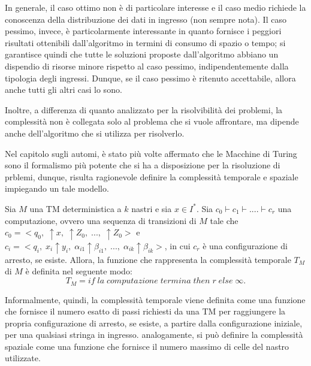   In generale, il caso ottimo non è di particolare interesse e il caso medio richiede la conoscenza della distribuzione dei dati in ingresso (non sempre nota). Il caso pessimo, invece, è particolarmente interessante in quanto fornisce i peggiori risultati ottenibili dall'algoritmo in termini di consumo di spazio o tempo; si garantisce quindi che tutte le soluzioni proposte dall'algoritmo abbiano un dispendio di risorse minore rispetto al caso pessimo, indipendentemente dalla tipologia degli ingressi. Dunque, se il caso pessimo è ritenuto accettabile, allora anche tutti gli altri casi lo sono. 

  Inoltre, a differenza di quanto analizzato per la risolvibilità dei problemi, la complessità non è collegata solo al problema che si vuole affrontare, ma dipende anche dell'algoritmo che si utilizza per risolverlo. 

  \vspace*{10px}

  Nel capitolo sugli automi, è stato più volte affermato che le Macchine di Turing sono il formalismo più potente che si ha a disposizione per la risoluzione di prblemi, dunque, risulta ragionevole definire la complessità temporale e spaziale impiegando un tale modello.

  \begin{definition} \label{complessita temporale} 
    Sia \(M\) una TM deterministica a \(k\) nastri e sia \(x\in I^*\). Sia \(c_0\vdash c_1\vdash....\vdash c_r\) una computazione, ovvero una sequenza di transizioni di \(M\) tale che \(c_0=<q_0,\;\!\uparrow\! x,\; \!\uparrow\! Z_0,\; ...,\; \!\uparrow\! Z_0>\) e \\ \(c_i=<q_i,\;x_i\!\uparrow\! y_i,\; \alpha_{i1}\!\uparrow\! \beta_{i1},\; ...,\; \alpha_{ik}\!\uparrow\! \beta_{ik}>\), in cui \(c_r\) è una configurazione di arresto, se esiste. Allora, la funzione che rappresenta la complessità temporale \({T}_M\) di \(M\) è definita nel seguente modo:
    \begin{equation*}
      {T}_M=if\;la\;computazione\;termina\;then\;r\;else\;\infty.
    \end{equation*}
  \end{definition}

  Informalmente, quindi, la complessità temporale viene definita come una funzione che fornisce il numero esatto di passi richiesti da una TM per raggiungere la propria configurazione di arresto, se esiste, a partire dalla configurazione iniziale, per una qualsiasi stringa in ingresso. analogamente, si può definire la complessità spaziale come una funzione che fornisce il numero massimo di celle del nastro utilizzate.


